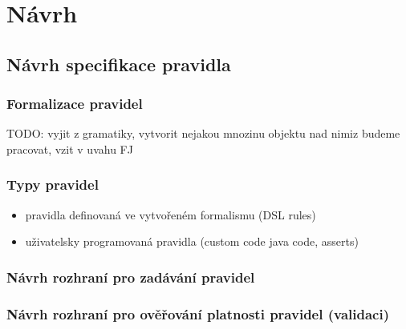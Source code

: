 \chapter{Návrh}

\section{Návrh specifikace pravidla}

\subsection{Formalizace pravidel}

TODO: vyjit z gramatiky, vytvorit nejakou mnozinu objektu nad nimiz budeme pracovat, vzit v uvahu FJ

\subsection{Typy pravidel}
\begin{itemize}
\item pravidla definovaná ve vytvořeném formalismu (DSL rules)
\item uživatelsky programovaná pravidla (custom code java code, asserts)
\end{itemize}

\subsection{Návrh rozhraní pro zadávání pravidel}

\subsection{Návrh rozhraní pro ověřování platnosti pravidel (validaci)}

